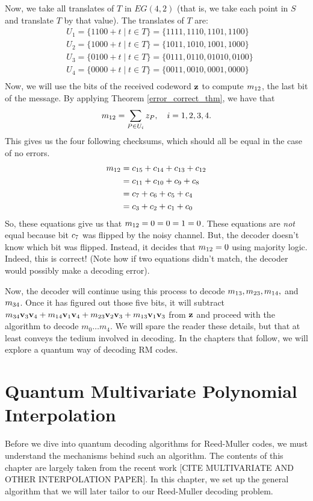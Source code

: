 \documentclass[12pt,twoside]{reedthesis}
\theoremstyle{definition}
\begin{document}
Now, we take all translates of $T$ in $EG(4,2)$ (that is, we take each point in $S$ and translate $T$ by that value). The translates of $T$ are: 
\begin{align*}
& U_1 =  \{1100 + t \mid t \in T\} = \{1111, 1110, 1101, 1100\} \\
& U_2 = \{1000 + t \mid t \in T\} = \{1011, 1010, 1001, 1000\} \\
& U_3 = \{0100 + t \mid t \in T\} = \{0111, 0110, 01010, 0100\} \\
& U_4 =  \{0000 + t \mid t \in T\} = \{0011, 0010, 0001, 0000\} \\
\end{align*}
Now, we will use the bits of the received codeword $\mathbf{z}$ to compute $m_{12}$, the last bit of the message. By applying Theorem \ref{error_correct_thm}, we have that 
\begin{equation*}
m_{12}  = \sum_{P \in U_i} z_{P}, \quad i = 1,2,3,4. 
\end{equation*}
This gives us the four following checksums, which should all be equal in the case of no errors.
\begin{align*}
m_{12} 
& = c_{15} + c_{14} + c_{13} + c_{12}\\
& = c_{11} + c_{10} + c_{9} + c_{8}\\
& = c_{7} + c_{6} + c_{5} + c_{4} \\
& = c_{3} + c_{2} + c_{1} + c_{0}
\end{align*}
So, these equations give us that $m_{12} =0 =0=1=0 $. These equations are \textit{not} equal because bit $c_{7}$ was flipped by the noisy channel. But, the decoder doesn't know which bit was flipped. Instead, it decides that $m_{12} = 0$ using majority logic. Indeed, this is correct! (Note how if two equations didn't match, the decoder would possibly make a decoding error).

Now, the decoder will continue using this process to decode $m_{13}, m_{23}, m_{14}, $ and $m_{34}$. Once it has figured out those five bits, it will subtract $m_{34}\mathbf{v}_{3}\mathbf{v}_{4} + m_{14}\mathbf{v}_{1}\mathbf{v}_{4} + m_{23}\mathbf{v}_{2}\mathbf{v}_{3} + m_{13}\mathbf{v}_{1}\mathbf{v}_{3}$ from $\mathbf{z}$ and proceed with the algorithm to decode $m_0 \ldots m_4$. We will spare the reader these details, but that at least conveys the tedium involved in decoding. In the chapters that follow, we will explore a quantum way of decoding RM codes.

\chapter{Quantum Multivariate Polynomial Interpolation}
Before we dive into quantum decoding algorithms for Reed-Muller codes, we must understand the mechanisms behind such an algorithm. The contents of this chapter are largely taken from the recent work [CITE MULTIVARIATE AND OTHER INTERPOLATION PAPER]. In this chapter, we set up the general algorithm that we will later tailor to our Reed-Muller decoding problem. 
\end{document}
